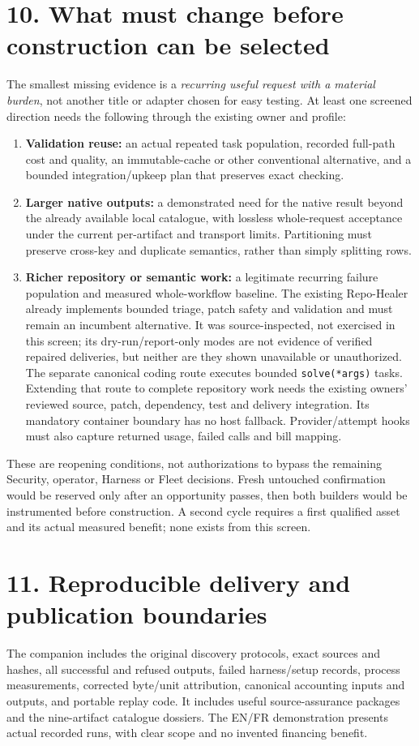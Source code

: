 \documentclass[11pt,letterpaper]{article}
\newcommand{\code}[1]{{\small\nolinkurl{#1}}}
\newcommand{\sect}[1]{\section*{#1}}
\begin{document}
\sect{10. What must change before construction can be selected}
The smallest missing evidence is a \emph{recurring useful request with a material burden}, not another title or adapter chosen for easy testing. At least one screened direction needs the following through the existing owner and profile:
\begin{enumerate}
\item \textbf{Validation reuse:} an actual repeated task population, recorded full-path cost and quality, an immutable-cache or other conventional alternative, and a bounded integration/upkeep plan that preserves exact checking.
\item \textbf{Larger native outputs:} a demonstrated need for the native result beyond the already available local catalogue, with lossless whole-request acceptance under the current per-artifact and transport limits. Partitioning must preserve cross-key and duplicate semantics, rather than simply splitting rows.
\item \textbf{Richer repository or semantic work:} a legitimate recurring failure population and measured whole-workflow baseline. The existing Repo-Healer already implements bounded triage, patch safety and validation and must remain an incumbent alternative. It was source-inspected, not exercised in this screen; its dry-run/report-only modes are not evidence of verified repaired deliveries, but neither are they shown unavailable or unauthorized. The separate canonical coding route executes bounded \code{solve(*args)} tasks. Extending that route to complete repository work needs the existing owners' reviewed source, patch, dependency, test and delivery integration. Its mandatory container boundary has no host fallback. Provider/attempt hooks must also capture returned usage, failed calls and bill mapping.\cite{boundaries}
\end{enumerate}
These are reopening conditions, not authorizations to bypass the remaining Security, operator, Harness or Fleet decisions. Fresh untouched confirmation would be reserved only after an opportunity passes, then both builders would be instrumented before construction. A second cycle requires a first qualified asset and its actual measured benefit; none exists from this screen.

\sect{11. Reproducible delivery and publication boundaries}
The companion includes the original discovery protocols, exact sources and hashes, all successful and refused outputs, failed harness/setup records, process measurements, corrected byte/unit attribution, canonical accounting inputs and outputs, and portable replay code. It includes useful source-assurance packages and the nine-artifact catalogue dossiers. The EN/FR demonstration presents actual recorded runs, with clear scope and no invented financing benefit.
\end{document}
